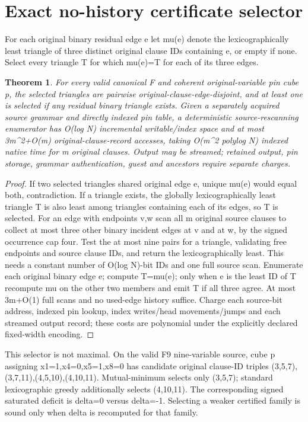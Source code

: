 \documentclass[10pt]{article}
\newtheorem{theorem}{Theorem}
\begin{document}
\section{Exact no-history certificate selector}
For each original binary residual edge e let mu(e) denote the lexicographically least triangle of three distinct original clause IDs containing e, or empty if none. Select every triangle T for which mu(e)=T for each of its three edges.
\begin{theorem}
For every valid canonical F and coherent original-variable pin cube p, the selected triangles are pairwise original-clause-edge-disjoint, and at least one is selected if any residual binary triangle exists. Given a separately acquired source grammar and directly indexed pin table, a deterministic source-rescanning enumerator has O(log N) incremental writable/index space and at most 3m^2+O(m) original-clause-record accesses, taking O(m^2 polylog N) indexed native time for m original clauses. Output may be streamed; retained output, pin storage, grammar authentication, guest and ancestors require separate charges.
\end{theorem}
\begin{proof}
If two selected triangles shared original edge e, unique mu(e) would equal both, contradiction. If a triangle exists, the globally lexicographically least triangle T is also least among triangles containing each of its edges, so T is selected. For an edge with endpoints v,w scan all m original source clauses to collect at most three other binary incident edges at v and at w, by the signed occurrence cap four. Test the at most nine pairs for a triangle, validating free endpoints and source clause IDs, and return the lexicographically least. This needs a constant number of O(log N)-bit IDs and one full source scan. Enumerate each original binary edge e; compute T=mu(e); only when e is the least ID of T recompute mu on the other two members and emit T if all three agree. At most 3m+O(1) full scans and no used-edge history suffice. Charge each source-bit address, indexed pin lookup, index writes/head movements/jumps and each streamed output record; these costs are polynomial under the explicitly declared fixed-width encoding.
\end{proof}
This selector is not maximal. On the valid F9 nine-variable source, cube p assigning x1=1,x4=0,x5=1,x8=0 has candidate original clause-ID triples (3,5,7),(3,7,11),(4,5,10),(4,10,11). Mutual-minimum selects only (3,5,7); standard lexicographic greedy additionally selects (4,10,11). The corresponding signed saturated deficit is delta=0 versus delta=-1. Selecting a weaker certified family is sound only when delta is recomputed for that family.
\end{document}
